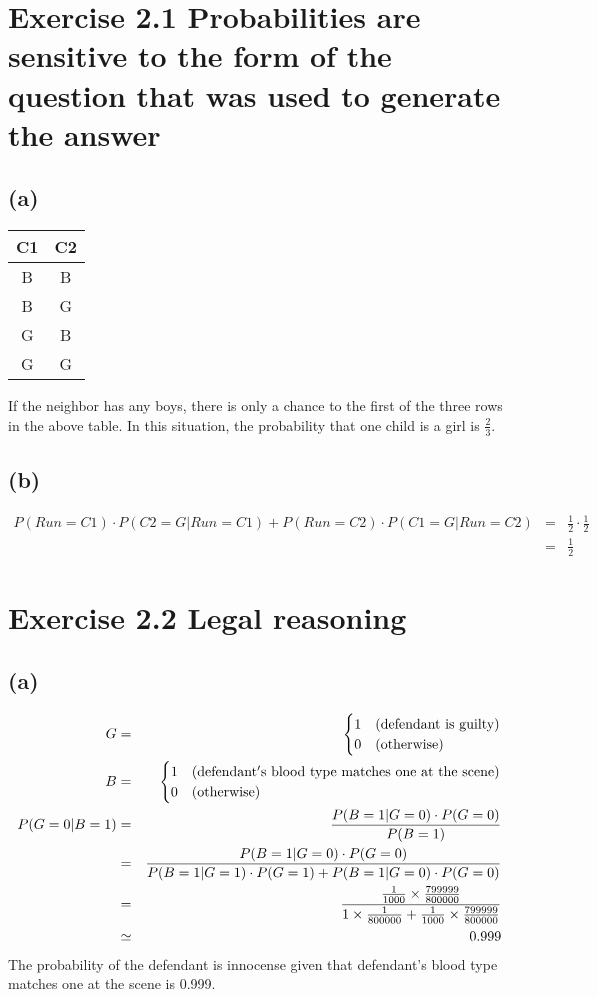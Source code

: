\documentclass{jsarticle}
\begin{document}
\section*{Exercise 2.1 Probabilities are sensitive to the form of the question that was used to generate the answer}
\subsection*{(a)}
\begin{table}[htbp]
\centering
\begin{tabular}{cc}
C1 & C2 \\ \hline
B & B\\
B & G\\
G & B\\
G & G
\end{tabular}
\end{table}
If the neighbor has any boys, there is only a chance to the first of the three rows in the above table.
In this situation, the probability that one child is a girl is $\frac{2}{3}$.
\subsection*{(b)}
\begin{eqnarray*}
P(Run=C1)\cdot P(C2=G|Run=C1)+P(Run=C2)\cdot P(C1=G|Run=C2) & = & \frac{1}{2}\cdot\frac{1}{2}\\ & = & \frac{1}{2}
\end{eqnarray*}

\section*{Exercise 2.2 Legal reasoning}
\subsection*{(a)}
\begin{eqnarray}
G & = & \begin{cases}
1 & (\rm defendant\ is\ guilty) \\
0 & (\rm otherwise)
\end{cases}\\
B & = & \begin{cases}
1 & (\rm defendant's\ blood\ type\ matches\ one\ at\ the\ scene)\\
0 & (\rm otherwise)
\end{cases}\\
P(G=0|B=1) & = & \frac{P(B=1|G=0)\cdot P(G=0)}{P(B=1)}\\
& = & \frac{P(B=1|G=0)\cdot P(G=0)}{P(B=1|G=1)\cdot P(G=1)+P(B=1|G=0)\cdot P(G=0)}\\
& = & \frac{\frac{1}{1000}\times \frac{799999}{800000}}{1\times \frac{1}{800000} + \frac{1}{1000} \times \frac{799999}{800000}}\\
& \simeq & 0.999
\end{eqnarray}
The probability of the defendant is innocense given that defendant's blood type matches one at the scene is 0.999.
\end{document}
